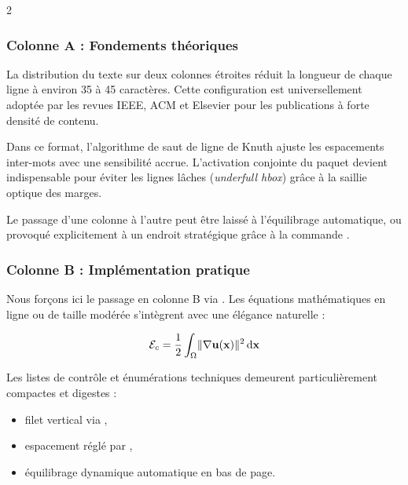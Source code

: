 \begin{multicols}{2}

\subsubsection{Colonne A : Fondements théoriques}
La distribution du texte sur deux colonnes étroites réduit la longueur de chaque ligne
à environ 35 à 45 caractères.
Cette configuration est universellement adoptée par les revues IEEE, ACM et Elsevier
pour les publications à forte densité de contenu.

Dans ce format, l'algorithme de saut de ligne de Knuth ajuste les espacements inter-mots
avec une sensibilité accrue.
L'activation conjointe du paquet  devient indispensable
pour éviter les lignes lâches (\textit{underfull hbox}) grâce à la saillie optique des marges.

Le passage d'une colonne à l'autre peut être laissé à l'équilibrage automatique,
ou provoqué explicitement à un endroit stratégique grâce à la commande .

\columnbreak

\subsubsection{Colonne B : Implémentation pratique}
Nous forçons ici le passage en colonne B via .
Les équations mathématiques en ligne ou de taille modérée
s'intègrent avec une élégance naturelle :

\begin{equation}
  \label{eq:densite-energie}
  \mathcal{E}_c = \frac{1}{2} \int_{\Omega} \lVert\nabla \boldsymbol{\mathbf{u}}(\boldsymbol{\mathbf{x}})\rVert^2 \mathop{}\!\mathrm{d} \boldsymbol{\mathbf{x}}
\end{equation}

Les listes de contrôle et énumérations techniques
demeurent particulièrement compactes et digestes :
\begin{itemize}
  \item filet vertical via ,
  \item espacement réglé par ,
  \item équilibrage dynamique automatique en bas de page.
\end{itemize}

\end{multicols}

\setlength{\columnseprule}{0pt} %

